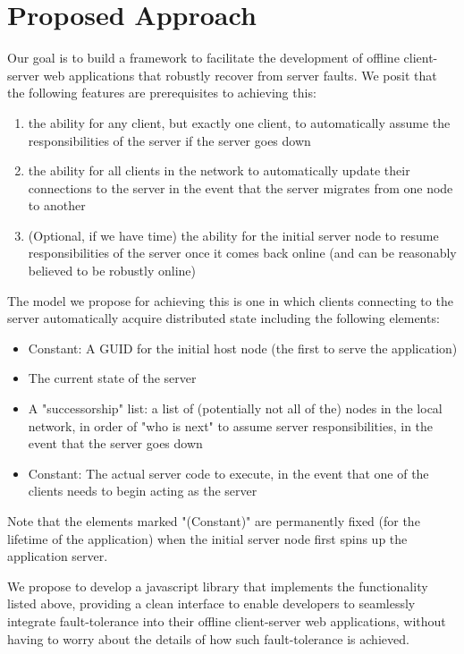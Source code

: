 \section{Proposed Approach}
\label{sec:approach}

Our goal is to build a framework to facilitate the development of offline client-server web applications that robustly recover from server faults. 
We posit that the following features are prerequisites to achieving this:

\begin{enumerate}
	\item the ability for any client, but exactly one client, to automatically assume the responsibilities of the server if the server goes down
    \item the ability for all clients in the network to automatically update their connections to the server in the event that the server migrates from one node to another
    \item (Optional, if we have time) the ability for the initial server node to resume responsibilities of the server once it comes back online (and can be reasonably believed to be robustly online)
\end{enumerate}

The model we propose for achieving this is one in which clients connecting to the server automatically acquire distributed state including the following elements:

\begin{itemize}
	\item Constant: A GUID for the initial host node (the first to serve the application)
    \item The current state of the server
	\item A "successorship" list: a list of (potentially not all of the) nodes in the local network, in order of "who is next" to assume server responsibilities, in the event that the server goes down
    \item Constant: The actual server code to execute, in the event that one of the clients needs to begin acting as the server
\end{itemize}

Note that the elements marked "(Constant)" are permanently fixed (for the lifetime of the application) when the initial server node first spins up the application server. 

We propose to develop a javascript library that implements the functionality listed above, providing a clean interface to enable developers to seamlessly integrate fault-tolerance into their offline client-server web applications, without having to worry about the details of how such fault-tolerance is achieved.

